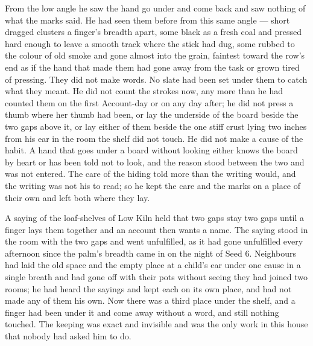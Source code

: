 \scenebreak

From the low angle he saw the hand go under and come back and saw nothing of what the marks said. He had seen them before from this same angle --- short dragged clusters a finger's breadth apart, some black as a fresh coal and pressed hard enough to leave a smooth track where the stick had dug, some rubbed to the colour of old smoke and gone almost into the grain, faintest toward the row's end as if the hand that made them had gone away from the task or grown tired of pressing. They did not make  words. No slate had been set under them to catch what they meant. He did not count the strokes now, any more than he had counted them on the first Account-day or on any day after; he did not press a thumb where her thumb had been, or lay the underside of the board beside the two gaps above it, or lay either of them beside the one stiff crust lying two inches from his ear in the room the shelf did not touch. He did not make a cause of the habit. A hand that goes under a board without looking either knows the board by heart or has been told not to look, and the reason stood between the two and was not entered. The care of the hiding told more than the writing would, and the writing was not his to read; so he kept the care and the marks on a place of their own and left both where they lay.

A saying of the loaf-shelves of Low Kiln held that two gaps stay two gaps until a finger lays them together and an account then wants a name. The saying stood in the room with the two gaps and went unfulfilled, as it had gone unfulfilled every afternoon since the palm's breadth came in on the night of Seed 6. Neighbours had laid the old space and the empty place at a child's ear under one cause in a single breath and had gone off with their pots without seeing they had joined two rooms; he had heard the sayings and kept each on its own place, and had not made any of them his own. Now there was a third place under the shelf, and a finger had been under it and come away without a word, and still nothing touched. The keeping was exact and invisible and was the only work in this house that nobody had asked him to do.

